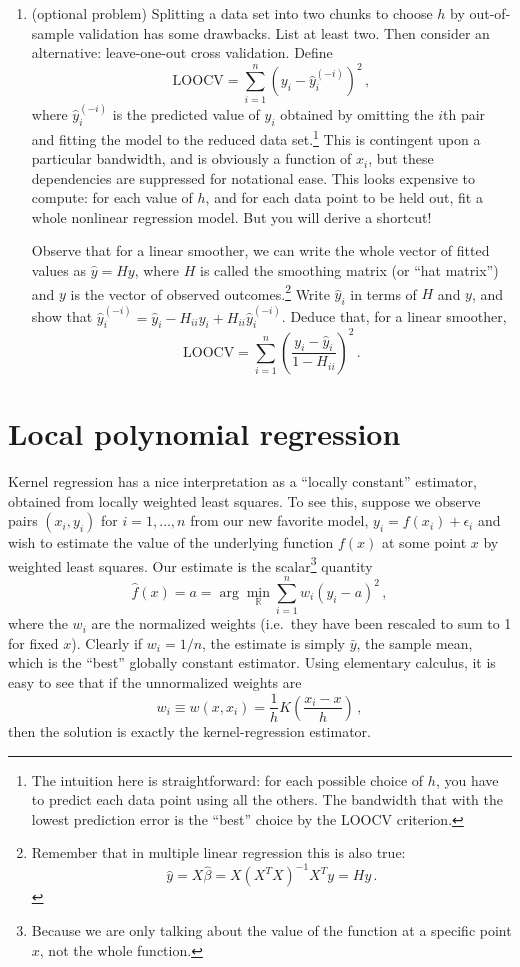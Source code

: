\documentclass{homework}
\begin{document}
\begin{enumerate}[label=(\Alph*)]
\item (optional problem) Splitting a data set into two chunks to choose $h$ by out-of-sample validation has some drawbacks.  List at least two.  Then consider an alternative: leave-one-out cross validation.  Define
$$
\mbox{LOOCV} = \sum_{i=1}^n \left( y_i - \hat{y}_{i}^{(-i)} \right)^2 \, ,
$$
where $\hat{y}_{i}^{(-i)} $ is the predicted value of $y_i$ obtained by omitting the $i$th pair and fitting the model to the reduced data set.\footnote{The intuition here is straightforward: for each possible choice of $h$, you have to predict each data point using all the others.  The bandwidth that with the lowest prediction error is the ``best'' choice by the LOOCV criterion.}  This is contingent upon a particular bandwidth, and is obviously a function of $x_i$, but these dependencies are suppressed for notational ease.  This looks expensive to compute: for each value of $h$, and for each data point to be held out, fit a whole nonlinear regression model.  But you will derive a shortcut!

Observe that for a linear smoother, we can write the whole vector of fitted values as $\hat{y} = H y$, where $H$ is called the smoothing matrix (or ``hat matrix'') and $y$ is the vector of observed outcomes.\footnote{Remember that in multiple linear regression this is also true: $$\hat{y} = X \hat{\beta} = X (X^T X)^{-1} X^T y = Hy \, .$$}  Write $\hat{y}_i$ in terms of $H$ and $y$, and show that $\hat{y}_i^{(-i)} = \hat{y}_i - H_{ii} y_i + H_{ii} \hat{y}_i^{(-i)}$.  Deduce that, for a linear smoother,
$$
\mbox{LOOCV} = \sum_{i=1}^n \left( \frac{  y_i - \hat{y}_{i} } {1-H_{ii}} \right)^2 \, .
$$


\end{enumerate}



\section{Local polynomial regression}

Kernel regression has a nice interpretation as a ``locally constant'' estimator, obtained from locally weighted least squares.  To see this, suppose we observe pairs $(x_i, y_i)$ for $i = 1, \ldots, n$ from our new favorite model, $y_i = f(x_i) + \epsilon_i$ and wish to estimate the value of the underlying function $f(x)$ at some point $x$ by weighted least squares.  Our estimate is the scalar\footnote{Because we are only talking about the value of the function at a specific point $x$, not the whole function.} quantity
$$
\hat{f}(x) = a = \arg \min_{\mathbb{R}} \sum_{i=1}^n w_i (y_i - a)^2 \, ,
$$
where the $w_i$ are the normalized weights (i.e.~they have been rescaled to sum to 1 for fixed $x$).  Clearly if $w_i = 1/n$, the estimate is simply $\bar{y}$, the sample mean, which is the ``best'' globally constant estimator.  Using elementary calculus, it is easy to see that if the unnormalized weights are
$$
w_i \equiv w(x, x_i) = \frac{1}{h} K \left( \frac{x_i - x}{h} \right)  \, ,
$$
then the solution is exactly the kernel-regression estimator.
\end{document}
